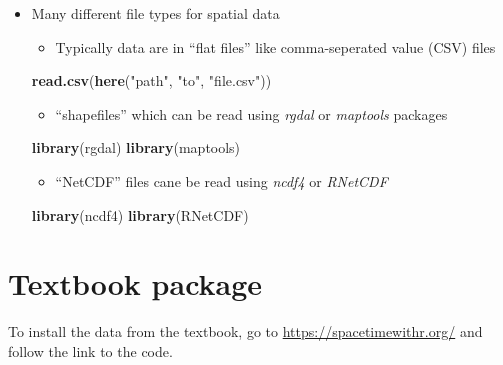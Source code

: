 \documentclass[]{book}
\newenvironment{Shaded}{\begin{snugshade}}{\end{snugshade}}
\newcommand{\KeywordTok}[1]{\textcolor[rgb]{0.13,0.29,0.53}{\textbf{#1}}}
\newcommand{\NormalTok}[1]{#1}
\newcommand{\StringTok}[1]{\textcolor[rgb]{0.31,0.60,0.02}{#1}}
\providecommand{\tightlist}{%
  \setlength{\itemsep}{0pt}\setlength{\parskip}{0pt}}
\begin{document}
\begin{itemize}
\item
  Many different file types for spatial data

  \begin{itemize}
  \tightlist
  \item
    Typically data are in ``flat files'' like comma-seperated value (CSV) files
  \end{itemize}

\begin{Shaded}
\begin{Highlighting}[]
\KeywordTok{read.csv}\NormalTok{(}\KeywordTok{here}\NormalTok{(}\StringTok{"path"}\NormalTok{, }\StringTok{"to"}\NormalTok{, }\StringTok{"file.csv"}\NormalTok{))}
\end{Highlighting}
\end{Shaded}

  \begin{itemize}
  \tightlist
  \item
    ``shapefiles'' which can be read using \emph{rgdal} or \emph{maptools} packages
  \end{itemize}

\begin{Shaded}
\begin{Highlighting}[]
\KeywordTok{library}\NormalTok{(rgdal)}
\KeywordTok{library}\NormalTok{(maptools)}
\end{Highlighting}
\end{Shaded}

  \begin{itemize}
  \tightlist
  \item
    ``NetCDF'' files cane be read using \emph{ncdf4} or \emph{RNetCDF}
  \end{itemize}

\begin{Shaded}
\begin{Highlighting}[]
\KeywordTok{library}\NormalTok{(ncdf4)}
\KeywordTok{library}\NormalTok{(RNetCDF)}
\end{Highlighting}
\end{Shaded}
\end{itemize}

\hypertarget{textbook-package}{%
\section{Textbook package}\label{textbook-package}}

To install the data from the textbook, go to \url{https://spacetimewithr.org/} and follow the link to the code.
\end{document}
